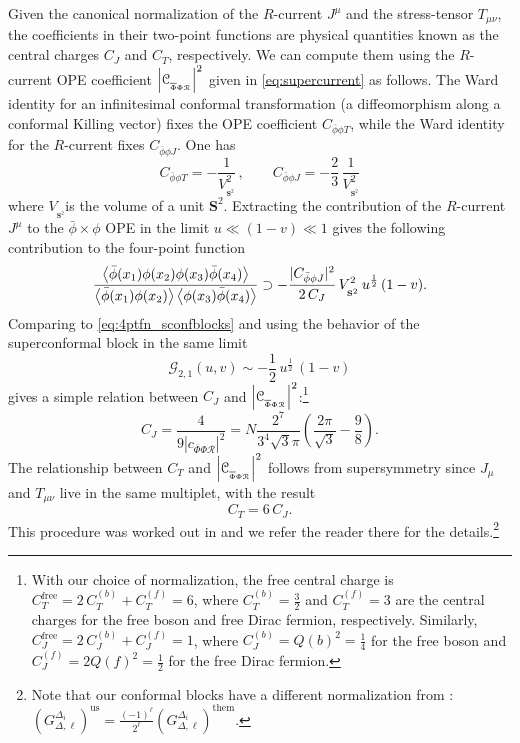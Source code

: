 \documentclass[11pt]{article}
\newcommand{\Phib}{\overline{\Phi}}
\newcommand{\phib}{\bar{\phi}}
\newcommand{\cope}[1]{\mathcal{C}_{_{#1}}}
\begin{document}
Given the canonical normalization of the $R$-current $J^\mu$ and the stress-tensor $T_{\mu\nu}$, the coefficients in their two-point functions are physical quantities known as the central charges $C_{J}$ and $C_{T}$, respectively. We can compute them using the $R$-current OPE coefficient $\abs{\cope{\Phib\Phi \mathcal{R}}}^{2}$ given in \eqref{eq:supercurrent} as follows. The Ward identity for an infinitesimal  conformal transformation (a diffeomorphism along a conformal Killing vector)  fixes the OPE coefficient
$C_{\phib\phi T}$, while the Ward identity for the $R$-current fixes $C_{\phib\phi J}$. One has 
%
\begin{equation}
C_{\phib\phi T} = -\frac{1}{V^2_{_{\mathbf{S}^2}}}  \,, \qquad C_{\phib\phi J} = -\frac{2}{3} \, \frac{1}{V^2_{_{\mathbf{S}^2}}} 
\end{equation}  
%
where $V_{_{\mathbf{S}^2}}$is the volume of a unit $\mathbf{S}^2$.  Extracting the contribution of the $R$-current $J^\mu$ to the $\phib \times \phi$ OPE in the limit $u \ll (1-v) \ll 1$ gives the following contribution to the four-point function
%
\begin{equation}\label{eq:Rcurr_4ptfn}
\frac{\expval{\phib(x_{1})\phi(x_{2})\phi(x_{3})\phib(x_{4})}}{\expval{\phib(x_{1})\phi(x_{2})}\expval{\phi(x_{3})\phib(x_{4})}} \supset 
	-\frac{|C_{\phib\phi J}|^{2}}{2\, C_J}\, V_{_{\mathbf{S}^{2}}}^2\, u^{\frac{1}{2}}\, (1-v).
\end{equation}
%
Comparing to \eqref{eq:4ptfn_sconfblocks} and using the behavior of the superconformal block in the same limit
%
\begin{equation}\label{eq:sconfblockOPElimit}
\mathcal{G}_{2,1}(u,v) \sim -\frac{1}{2} \, u^{\frac{1}{2}}\, (1-v)
\end{equation}
%
gives a simple relation between $C_{J}$ and $\abs{\cope{\Phib\Phi \mathcal{R}} }^2$:\footnote{
With our choice of normalization, the free central charge is $C_T^{\mathrm{free}} = 2\, C_T^{(b)}+C_T^{(f)} = 6$, where $C_{T}^{(b)} = \frac{3}{2}$ and $C_{T}^{(f)} = 3$ are the central charges for the free boson and free Dirac fermion, respectively. Similarly, $C_{J}^{\mathrm{free}} = 2\, C_{J}^{(b)}+C_{J}^{(f)} = 1$, where $C_{J}^{(b)} = Q(b)^2 = \frac{1}{4}$ for the free boson and $C_{J}^{(f)} = 2Q(f)^2 = \frac{1}{2}$ for the free Dirac fermion.}
%
\begin{equation}\label{eq:CJOPErelation}
C_{J} = \frac{4}{9|c_{\overline{\Phi}\Phi\mathcal{R}}|^2} = N\frac{2^{7}}{3^{4}\sqrt{3}\pi}\left(\frac{2\pi}{\sqrt{3}}-\frac{9}{8}\right).
\end{equation}
%
The relationship between $C_{T}$ and $\abs{\cope{\Phib\Phi \mathcal{R}} }^{2}$ follows from supersymmetry since $J_\mu$ and $T_{\mu\nu}$ live in the same multiplet, with the result
%
\begin{equation}\label{eq:CT}
C_{T} = 6\,C_{J}.
\end{equation}
%
This procedure was worked out in \cite{Chang:2017xmr} and we refer the reader there for the details.\footnote{Note that our conformal blocks have a different normalization from \cite{Chang:2017xmr}: $(G_{\Delta,\ell}^{\Delta_{i}})^{\mathrm{us}} = \frac{(-1)^{\ell}}{2^{\ell}}(G_{\Delta,\ell}^{\Delta_{i}})^{\mathrm{them}}$.}
\end{document}

